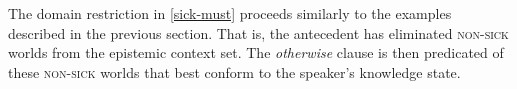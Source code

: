 %		
%		
%		
%		

The domain restriction in \ref{sick-must} proceeds similarly to the examples described in the previous section. %
That is, the antecedent has eliminated \textsc{non-sick} worlds from the epistemic context set. The \textit{otherwise} clause is then predicated of these \textsc{non-sick} worlds that best conform to the speaker's knowledge state.

